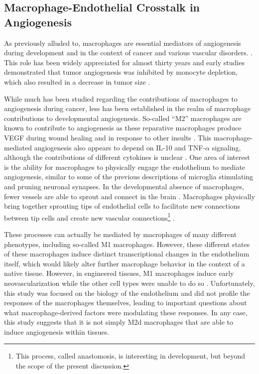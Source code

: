 \subsection{Macrophage\hyp{}Endothelial Crosstalk in Angiogenesis}\label{macang}

As previously alluded to, macrophages are essential mediators of angiogenesis during development and in the context of cancer and various vascular disorders. \citep{Sunderkotter1994, Ribatti2007, Chung2011, Weis2011}. This role has been widely appreciated for almost thirty years and early studies demonstrated that tumor angiogenesis was inhibited by monocyte depletion, which also resulted in a decrease in tumor size \citep{Sunderkotter1994}. 

While much has been studied regarding the contributions of macrophages to angiogenesis during cancer, less has been established in the realm of macrophage contributions to developmental angiogenesis. So\hyp{}called ``M2'' macrophages are known to contribute to angiogenesis as these reparative macrophages produce VEGF during wound healing and in response to other insults \citep{Jetten2014}. This macrophage\hyp{}mediated angiogenesis also appears to depend on IL\hyp{}10 and TNF\hyp{}$\alpha$ signaling, although the contributions of different cytokines is unclear \citep{Nakamura2015, Leibovich1987}. One area of interest is the ability for macrophages to physically engage the endothelium to mediate angiogenesis, similar to some of the previous descriptions of microglia stimulating and pruning neuronal synapses. In the developmental absence of macrophages, fewer vessels are able to sprout and connect in the brain \citep{Fantin2010}. Macrophages physically bring together sprouting tips of endothelial cells to facilitate new connections between tip cells and create new vascular connections\footnote{This process, called anastomosis, is interesting in development, but beyond the scope of the present discussion.} \citep{Liu2016}. 

These processes can actually be mediated by macrophages of many different phenotypes, including so\hyp{}called M1 macrophages. However, these different states of these macrophages induce distinct transcriptional changes in the endothelium itself, which would likely alter further macrophage behavior in the context of a native tissue. However, in engineered tissues, M1 macrophages induce early neovascularization while the other cell types were unable to do so \citep{Graney2020}. Unfortunately, this study was focused on the biology of the endothelium and did not profile the responses of the macrophages themselves, leading to important questions about what macrophage\hyp{}derived factors were modulating these responses. In any case, this study suggests that it is not simply M2d macrophages that are able to induce angiogenesis within tissues.


